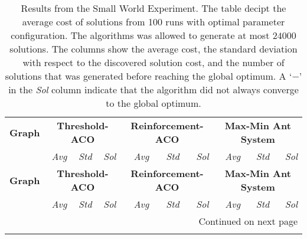 {\tiny
\renewcommand{\arraystretch}{1.2}
\begin{longtable}{lrrrrrrrrr}
   \caption[Experiment Results from the Small World Experiment]{Results from the Small World Experiment. The table decipt the average cost of solutions from 100 runs with optimal parameter configuration. The algorithms was allowed to generate at most $24000$ solutions. The columns show the average cost, the standard deviation with respect to the discovered solution cost, and the number of solutions that was generated before reaching the global optimum. A `$-$' in the \emph{Sol} column indicate that the algorithm did not always converge to the global optimum.}\\
   \toprule
   
  \textbf{Graph} & \multicolumn{3}{c}{\textbf{Threshold\@{-}ACO}} & \multicolumn{3}{c}{\textbf{Reinforcement\@{-}ACO}} & \multicolumn{3}{c}{\textbf{Max\@{-}Min Ant System}} \\
  \cmidrule(lr){2-4}
  \cmidrule(lr){5-7}
  \cmidrule(lr){8-10}
  & \emph{Avg} & \emph{Std} & \emph{Sol} & \emph{Avg} & \emph{Std} & \emph{Sol} & \emph{Avg} & \emph{Std} & \emph{Sol}\\
  \cmidrule(lr){2-2}
  \cmidrule(lr){3-3}
  \cmidrule(lr){4-4}
  \cmidrule(lr){5-5}
  \cmidrule(lr){6-6}
  \cmidrule(lr){7-7}
  \cmidrule(lr){8-8}
  \cmidrule(lr){9-9}
  \cmidrule(lr){10-10}
  \endfirsthead
  
  \textbf{Graph} & \multicolumn{3}{c}{\textbf{Threshold\@{-}ACO}} & \multicolumn{3}{c}{\textbf{Reinforcement\@{-}ACO}} & \multicolumn{3}{c}{\textbf{Max\@{-}Min Ant System}} \\
  \cmidrule(lr){2-4}
  \cmidrule(lr){5-7}
  \cmidrule(lr){8-10}
  & \emph{Avg} & \emph{Std} & \emph{Sol} & \emph{Avg} & \emph{Std} & \emph{Sol} & \emph{Avg} & \emph{Std} & \emph{Sol}\\
  \cmidrule(lr){2-2}
  \cmidrule(lr){3-3}
  \cmidrule(lr){4-4}
  \cmidrule(lr){5-5}
  \cmidrule(lr){6-6}
  \cmidrule(lr){7-7}
  \cmidrule(lr){8-8}
  \cmidrule(lr){9-9}
  \cmidrule(lr){10-10}
  \endhead
  
  \cmidrule(lr){8-10}
  \multicolumn{10}{r}{Continued on next page} \\
  \endfoot
  

\end{longtable}}
